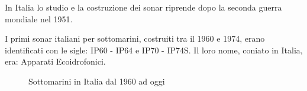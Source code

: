 In Italia lo studio e la costruzione dei sonar riprende dopo la seconda guerra mondiale nel 1951.

I primi sonar italiani per sottomarini, costruiti tra il 1960 e 1974, erano identificati con le sigle: IP60 - IP64 e IP70 - IP74S. 
Il loro nome, coniato in Italia, era: Apparati Ecoidrofonici.

\begin{figure}[h]
\centering 
{} \quad
{} \quad
{} \quad
\caption [Sottomarini in italia dal 1960 ad oggi]{Sottomarini in Italia dal 1960 ad oggi}
\end{figure}

